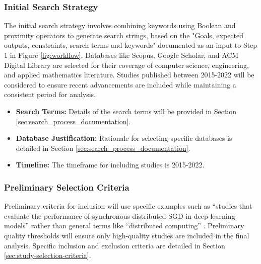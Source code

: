 \subsubsection{Initial Search Strategy}
The initial search strategy involves combining keywords using Boolean and proximity operators to
generate search strings, based on the "Goals, expected outputs, constraints, search terms and
keywords" documented as an input to Step 1 in Figure \ref{fig:workflow}. Databases like Scopus,
Google Scholar, and ACM Digital Library are selected for their coverage of computer science,
engineering, and applied mathematics literature. Studies published between 2015-2022 will be
considered to ensure recent advancements are included while maintaining a consistent period for
analysis.
\begin{itemize}
	\item \textbf{Search Terms:} Details of the search terms will be provided in Section \ref{sec:search_process_documentation}.
	\item \textbf{Database Justification:} Rationale for selecting specific databases is detailed in Section \ref{sec:search_process_documentation}.
	\item \textbf{Timeline:} The timeframe for including studies is 2015-2022.
\end{itemize}

\subsubsection{Preliminary Selection Criteria}
Preliminary criteria for inclusion will use specific examples such as ``studies that evaluate the
performance of synchronous distributed SGD in deep learning models'' rather than general terms like
``distributed computing'' \cite{ben-nun_demystifying_2020}. Preliminary quality thresholds will
ensure only high-quality studies are included in the final analysis. Specific inclusion and
exclusion criteria are detailed in Section \ref{sec:study-selection-criteria}.


